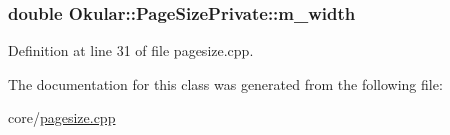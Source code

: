 \hypertarget{classOkular_1_1PageSizePrivate_a584076036562280f8d6c2819abeda0c6}{
\subsubsection[{m\+\_\+width}]{\setlength{\rightskip}{0pt plus 5cm}double Okular\+::\+Page\+Size\+Private\+::m\+\_\+width}}\label{classOkular_1_1PageSizePrivate_a584076036562280f8d6c2819abeda0c6}


Definition at line 31 of file pagesize.\+cpp.



The documentation for this class was generated from the following file\+:\begin{DoxyCompactItemize}
\item 
core/\hyperlink{pagesize_8cpp}{pagesize.\+cpp}\end{DoxyCompactItemize}
